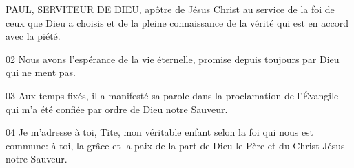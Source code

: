 PAUL, SERVITEUR DE DIEU, apôtre de Jésus Christ au service de la foi de ceux que Dieu a choisis et de la pleine connaissance de la vérité qui est en accord avec la piété.

02 Nous avons l’espérance de la vie éternelle, promise depuis toujours par Dieu qui ne ment pas.

03 Aux temps fixés, il a manifesté sa parole dans la proclamation de l’Évangile qui m’a été confiée par ordre de Dieu notre Sauveur.

04 Je m’adresse à toi, Tite, mon véritable enfant selon la foi qui nous est commune: à toi, la grâce et la paix de la part de Dieu le Père et du Christ Jésus notre Sauveur.
